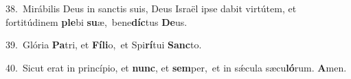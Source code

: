 {\numbfont\textcolor{\numbcolor}{38.}}~Mirábilis Deus in sanctis suis, Deus Israël ipse dabit virtútem, et fortitúdinem \textbf{ple}\-bi \textbf{su}\-æ,~\star bene\-\textbf{díc}\-tus \textbf{De}\-us.\par
{\numbfont\textcolor{\numbcolor}{39.}}~Glória \textbf{Pa}\-tri, et \textbf{Fí}\-\textbf{li}o,~\star et Spi\-\textbf{rí}\-tui \textbf{Sanc}\-to.\par
{\numbfont\textcolor{\numbcolor}{40.}}~Sicut erat in princípio, et \textbf{nunc}\-, et \textbf{sem}\-per,~\star et in sǽcula sæcu\-\textbf{ló}\-rum. \textbf{A}\-men.\par
